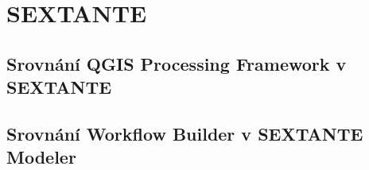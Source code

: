 \newpage
\chapter{SEXTANTE}

\section{Srovnání QGIS Processing Framework v SEXTANTE}
\section{Srovnání Workflow Builder v SEXTANTE Modeler}
